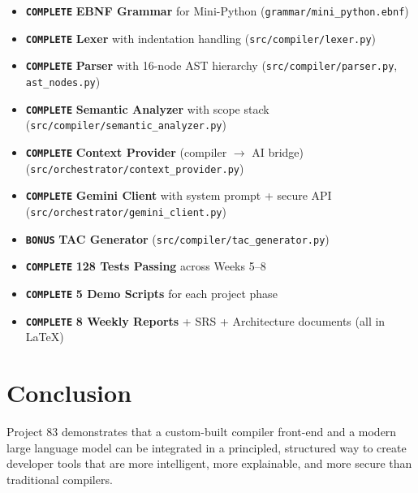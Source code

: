 \documentclass[a4paper,11pt]{article}
\newcommand{\statusdone}[1]{\colorbox{green!20}{\textbf{\texttt{#1}}}}
\newcommand{\statusbonus}[1]{\colorbox{purple!15}{\textbf{\texttt{#1}}}}
\begin{document}
\begin{tcolorbox}[colback=green!5!white, colframe=green!50!black, title={Final Deliverables Status}]
\begin{itemize}
    \item[\checkmark] \statusdone{COMPLETE} \textbf{EBNF Grammar} for Mini-Python (\texttt{grammar/mini\_python.ebnf})
    \item[\checkmark] \statusdone{COMPLETE} \textbf{Lexer} with indentation handling (\texttt{src/compiler/lexer.py})
    \item[\checkmark] \statusdone{COMPLETE} \textbf{Parser} with 16-node AST hierarchy (\texttt{src/compiler/parser.py}, \texttt{ast\_nodes.py})
    \item[\checkmark] \statusdone{COMPLETE} \textbf{Semantic Analyzer} with scope stack (\texttt{src/compiler/semantic\_analyzer.py})
    \item[\checkmark] \statusdone{COMPLETE} \textbf{Context Provider} (compiler $\to$ AI bridge) (\texttt{src/orchestrator/context\_provider.py})
    \item[\checkmark] \statusdone{COMPLETE} \textbf{Gemini Client} with system prompt + secure API (\texttt{src/orchestrator/gemini\_client.py})
    \item[\checkmark] \statusbonus{BONUS} \textbf{TAC Generator} (\texttt{src/compiler/tac\_generator.py})
    \item[\checkmark] \statusdone{COMPLETE} \textbf{128 Tests Passing} across Weeks 5--8
    \item[\checkmark] \statusdone{COMPLETE} \textbf{5 Demo Scripts} for each project phase
    \item[\checkmark] \statusdone{COMPLETE} \textbf{8 Weekly Reports} + SRS + Architecture documents (all in LaTeX)
\end{itemize}
\end{tcolorbox}


\section{Conclusion}

Project 83 demonstrates that a custom-built compiler front-end and a modern large language model can be integrated in a principled, structured way to create developer tools that are more intelligent, more explainable, and more secure than traditional compilers.
\end{document}
